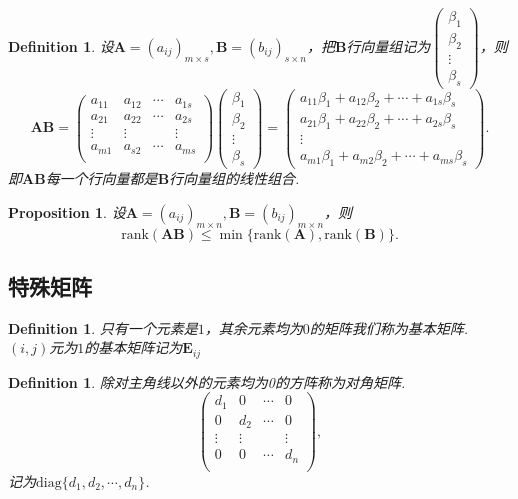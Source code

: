 \documentclass{article}
\newtheorem{proposition}[theorem]{Proposition}
\newtheorem{definition}[theorem]{Definition}
\newcommand{\mbf}[1]{\bm{#1}}
\newcommand{\rank}[1]{\text{rank}(#1)} %
\begin{document}
\begin{definition}
\rm 设$\mbf{A}=(a_{ij})_{m \times s},\mbf{B}=(b_{ij})_{s \times n}$，把$\mbf{B}$行向量组记为$\begin{pmatrix}
\beta_1 \\ \beta_2 \\ \vdots \\ \beta_s
\end{pmatrix}$，则
$$
\mbf{A}\mbf{B} = \begin{pmatrix}
a_{11} & a_{12} & \cdots & a_{1s} \\
a_{21} & a_{22} & \cdots & a_{2s} \\
\vdots & \vdots & 		 & \vdots \\
a_{m1} & a_{s2} & \cdots & a_{ms} \\
\end{pmatrix} \begin{pmatrix}
\beta_1 \\ \beta_2 \\ \vdots \\ \beta_s
\end{pmatrix} = 
\begin{pmatrix}
a_{11}\beta_1 + a_{12}\beta_2 + \cdots + a_{1s}\beta_s \\
a_{21}\beta_1 + a_{22}\beta_2 + \cdots + a_{2s}\beta_s \\
\vdots \\
a_{m1}\beta_1 + a_{m2}\beta_2 + \cdots + a_{ms}\beta_s 
\end{pmatrix}.
$$
即$\mbf{A}\mbf{B}$每一个行向量都是$\mbf{B}$行向量组的线性组合.
\end{definition}

\begin{proposition}\label{matrix-mul: rank}
\rm 设$\mbf{A}=(a_{ij})_{m\times n},\mbf{B} = (b_{ij})_{m\times n}$，则
$$
\rank{\mbf{A}\mbf{B}} \leq \min\{\rank{\mbf{A}}, \rank{\mbf{B}}\}.
$$
\end{proposition}

\subsection{特殊矩阵}

\begin{definition}
\rm 只有一个元素是$1$，其余元素均为$0$的矩阵我们称为基本矩阵. $(i,j)$元为$1$的基本矩阵记为$\mbf{E}_{ij}$
\end{definition}

\begin{definition}
\rm 除对主角线以外的元素均为0的方阵称为对角矩阵.
$$
\begin{pmatrix}
d_1 & 0 & \cdots & 0 \\
0 & d_2 & \cdots & 0 \\
\vdots & \vdots & & \vdots \\
0 & 0 &\cdots & d_n \\
\end{pmatrix},
$$
记为$\text{diag}\{d_1,d_2,\cdots,d_n\}$.
\end{definition}
\end{document}
